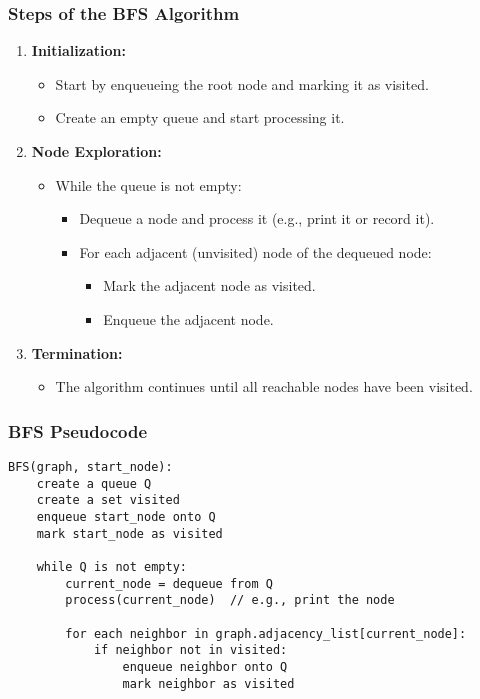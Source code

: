 \documentclass[aspectratio=169]{beamer}
\begin{document}
\begin{frame}[fragile]
    \frametitle{Steps of the BFS Algorithm}
    \begin{enumerate}
        \item \textbf{Initialization:}
            \begin{itemize}
                \item Start by enqueueing the root node and marking it as visited.
                \item Create an empty queue and start processing it.
            \end{itemize}
        \item \textbf{Node Exploration:}
            \begin{itemize}
                \item While the queue is not empty:
                    \begin{itemize}
                        \item Dequeue a node and process it (e.g., print it or record it).
                        \item For each adjacent (unvisited) node of the dequeued node:
                            \begin{itemize}
                                \item Mark the adjacent node as visited.
                                \item Enqueue the adjacent node.
                            \end{itemize}
                    \end{itemize}
            \end{itemize}
        \item \textbf{Termination:}
            \begin{itemize}
                \item The algorithm continues until all reachable nodes have been visited.
            \end{itemize}
    \end{enumerate}
\end{frame}

\begin{frame}[fragile]
    \frametitle{BFS Pseudocode}
    \begin{lstlisting}[language=plaintext]
BFS(graph, start_node):
    create a queue Q
    create a set visited
    enqueue start_node onto Q
    mark start_node as visited
    
    while Q is not empty:
        current_node = dequeue from Q
        process(current_node)  // e.g., print the node
        
        for each neighbor in graph.adjacency_list[current_node]:
            if neighbor not in visited:
                enqueue neighbor onto Q
                mark neighbor as visited
    \end{lstlisting}
\end{frame}
\end{document}
